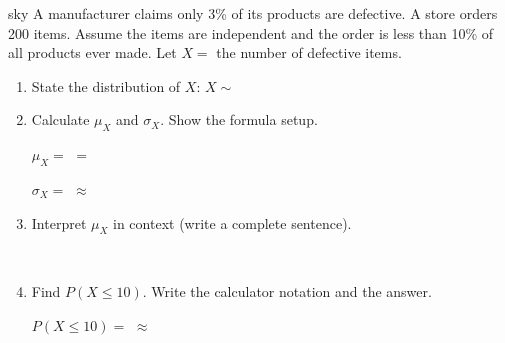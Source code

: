 \documentclass[10pt]{article}
\begin{document}
\namedateperiod

\vspace{0.14in}

\begin{scenariobox}[Context]{sky}
\small
A manufacturer claims only 3\% of its products are defective. A store orders
200 items. Assume the items are independent and the order is less than 10\%
of all products ever made. Let $X =$ the number of defective items.
\end{scenariobox}

\vspace{0.1in}

\begin{practicebox}
\small
\begin{enumerate}[leftmargin=1.5em, itemsep=10pt]

  \item State the distribution of $X$: $X \sim$ \blank{4cm}

  \item Calculate $\mu_X$ and $\sigma_X$. Show the formula setup.

  \vspace{4pt}
  $\mu_X = $ \blank{6cm} $= $ \blank{2cm}

  $\sigma_X = $ \blank{6cm} $\approx $ \blank{2cm}

  \item Interpret $\mu_X$ in context (write a complete sentence).

  \vspace{4pt}
  \writeline\\[1pt]\writeline

  \item Find $P(X \le 10)$. Write the calculator notation and the answer.

  \vspace{4pt}
  $P(X \le 10) = $ \blank{6cm} $\approx $ \blank{2cm}

\end{enumerate}
\end{practicebox}
\end{document}
